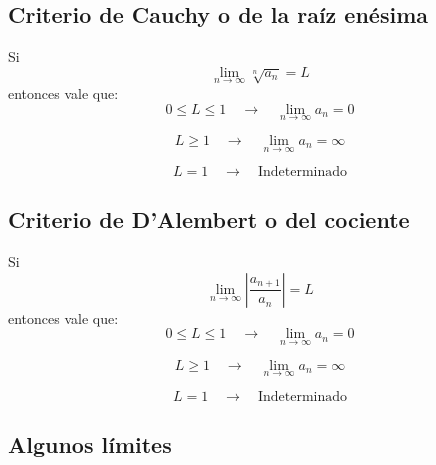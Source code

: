\documentclass[12pt,a4paper]{extarticle}
\begin{document}
\subsection{Criterio de Cauchy o de la ra\'iz en\'esima}
Si \[ \lim_{n \to \infty} \sqrt[n]{a_n} = L \] entonces vale que: \\
\[ 0 \leq L \leq 1  \quad \rightarrow \quad \lim_{n \to \infty} a_n =
0 \]

\[ L \geq 1  \quad \rightarrow \quad \lim_{n \to \infty} a_n =
\infty \]

\[ L = 1  \quad \rightarrow \quad \text{Indeterminado} \]


\subsection{Criterio de D'Alembert o del cociente}
Si \[ \lim_{n \to \infty} |\frac{a_{n + 1}}{a_n}| = L \] entonces vale que: \\
\[ 0 \leq L \leq 1  \quad \rightarrow \quad \lim_{n \to \infty} a_n =
0 \]

\[ L \geq 1  \quad \rightarrow \quad \lim_{n \to \infty} a_n =
\infty \]

\[ L = 1  \quad \rightarrow \quad \text{Indeterminado} \]

\subsection{Algunos l\'imites}
\end{document}
